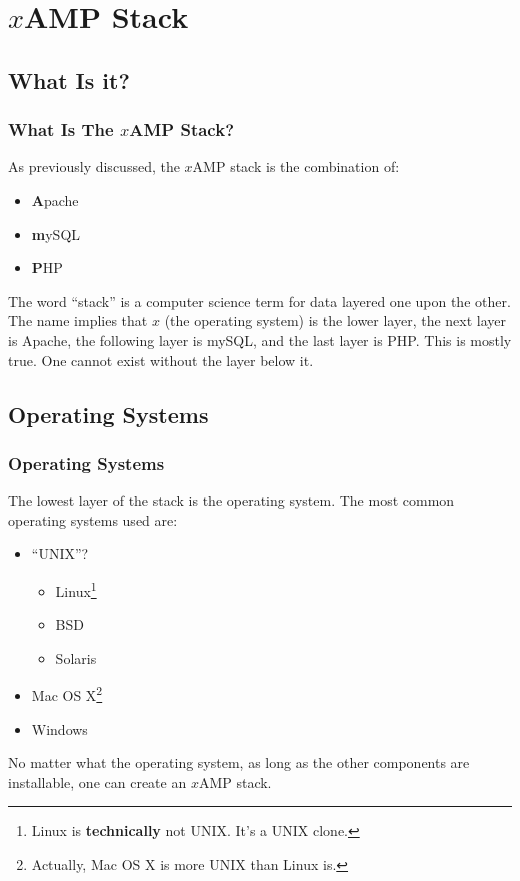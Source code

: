 \documentclass[aspectratio=169]{beamer}
\begin{document}
\section{$x$AMP Stack}
\subsection{What Is it?}
\begin{frame}
\frametitle{What Is The $x$AMP Stack?}
As previously discussed, the $x$AMP stack is the combination of:
\begin{itemize}
	\item \textbf{A}pache
	\item \textbf{m}ySQL
	\item \textbf{P}HP
\end{itemize}

\pause
The word ``stack'' is a computer science term for data layered one upon the other. The name implies that $x$ (the operating system) is the lower layer, the next layer is Apache, the following layer is mySQL, and the last layer is PHP. This is mostly true. One cannot exist without the layer below it.
\end{frame}

\subsection{Operating Systems}
\begin{frame}
\frametitle{Operating Systems}
The lowest layer of the stack is the operating system. The most common operating systems used are:
\begin{itemize}
	\item ``UNIX''?
	\begin{itemize}
		\item Linux\footnote{Linux is \textbf{technically} not UNIX. It's a UNIX clone.}
		\item BSD
		\item Solaris
	\end{itemize}
	\item Mac OS X\footnote{Actually, Mac OS X is more UNIX than Linux is.}
	\item Windows
\end{itemize}
No matter what the operating system, as long as the other components are installable, one can create an $x$AMP stack.
\end{frame}
\end{document}
